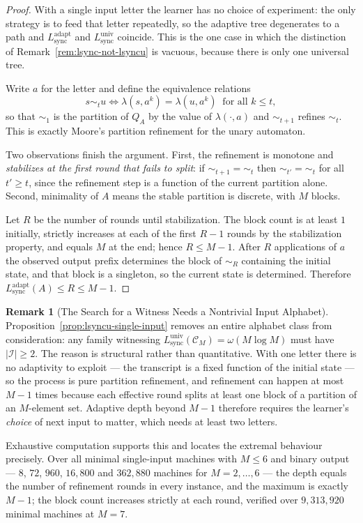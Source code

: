 \documentclass[12pt]{article}
\theoremstyle{definition}
\newtheorem{remark}[theorem]{Remark}
\newcommand{\Lsync}{L_{\mathrm{sync}}^{\mathrm{adapt}}}
\newcommand{\Lsyncu}{L_{\mathrm{sync}}^{\mathrm{univ}}}
\begin{document}
\begin{proof}
With a single input letter the learner has no choice of experiment: the only
strategy is to feed that letter repeatedly, so the adaptive tree degenerates to
a path and $\Lsync$ and $\Lsyncu$ coincide.  This is the one case in which the
distinction of Remark~\ref{rem:lsync-not-lsyncu} is vacuous, because there is
only one universal tree.

Write $a$ for the letter and define the equivalence relations
\[
s\sim_t u
\iff
\lambda(s,a^k)=\lambda(u,a^k)\ \text{ for all } k\le t ,
\]
so that $\sim_1$ is the partition of $Q_A$ by the value of $\lambda(\cdot,a)$
and $\sim_{t+1}$ refines $\sim_t$.  This is exactly Moore's partition
refinement for the unary automaton.

Two observations finish the argument.  First, the refinement is monotone and
\emph{stabilizes at the first round that fails to split}: if
$\sim_{t+1}=\sim_t$ then $\sim_{t'}=\sim_t$ for all $t'\ge t$, since the
refinement step is a function of the current partition alone.  Second,
minimality of $A$ means the stable partition is discrete, with $M$ blocks.

Let $R$ be the number of rounds until stabilization.  The block count is at
least $1$ initially, strictly increases at each of the first $R-1$ rounds by
the stabilization property, and equals $M$ at the end; hence $R\le M-1$.  After
$R$ applications of $a$ the observed output prefix determines the block of
$\sim_R$ containing the initial state, and that block is a singleton, so the
current state is determined.  Therefore
$L_{\mathrm{sync}}^{\mathrm{adapt}}(A)\le R\le M-1$.
\end{proof}

\begin{remark}[The Search for a Witness Needs a Nontrivial Input Alphabet]
\label{rem:witness-needs-two-inputs}
Proposition~\ref{prop:lsyncu-single-input} removes an entire alphabet class
from consideration: any family witnessing
$\Lsyncu(\mathcal C_M)=\omega(M\log M)$ must have $|\mathcal I|\ge2$.  The
reason is structural rather than quantitative.  With one letter there is no
adaptivity to exploit --- the transcript is a fixed function of the initial
state --- so the process is pure partition refinement, and refinement can
happen at most $M-1$ times because each effective round splits at least one
block of a partition of an $M$-element set.  Adaptive depth beyond $M-1$
therefore requires the learner's \emph{choice} of next input to matter, which
needs at least two letters.

Exhaustive computation supports this and locates the extremal behaviour
precisely.  Over all minimal single-input machines with $M\le6$ and binary
output --- $8$, $72$, $960$, $16{,}800$ and $362{,}880$ machines for
$M=2,\dots,6$ --- the depth equals the number of refinement rounds in every
instance, and the maximum is exactly $M-1$; the block count increases strictly
at each round, verified over $9{,}313{,}920$ minimal machines at $M=7$.
\end{remark}
\end{document}

